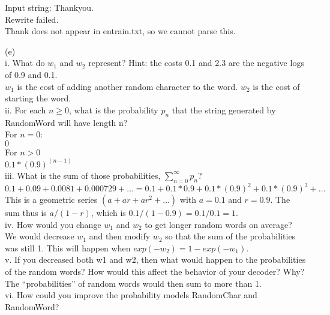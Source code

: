 \documentclass[11pt]{article} %
\begin{document}
Input string: Thankyou.\\
Rewrite failed.\\

Thank does not appear in entrain.txt, so we cannot parse this.\\

\newpage

(e) \\
i. What do $w_1$ and $w_2$ represent? Hint: the costs 0.1 and 2.3 are the negative logs of 0.9 and 0.1.\\

$w_1$ is the cost of adding another random character to the word. $w_2$ is the cost of starting the word.\\

ii. For each $n \geq 0$, what is the probability $p_n$ that the string generated by RandomWord will have length n?\\
For $n = 0$:\\
$0$\\
For $n > 0$\\
$0.1*(0.9)^(n-1)$\\

iii. What is the sum of those probabilities, $\sum_{n=0}^{\infty} p_n$?\\

$0.1 + 0.09 + 0.0081 + 0.000729 + \ldots = 0.1 + 0.1*0.9 + 0.1*(0.9)^2 + 0.1*(0.9)^3 + \ldots$\\
This is a geometric series $(a + ar + ar^2 + \ldots)$ with $a = 0.1$ and $r = 0.9$. The sum thus is $a/(1-r)$, which is $0.1/(1 - 0.9) = 0.1/0.1 = 1$. \\

iv. How would you change $w_1$ and $w_2$ to get longer random words on average?\\

We would decrease $w_1$ and then modify $w_2$ so that the sum of the probabilities was still 1. This will happen when $exp(-w_2) = 1 - exp(-w_1)$.\\

v. If you decreased both w1 and w2, then what would happen to the probabilities of the random words? How would this affect the behavior of your decoder? Why?\\

The ``probabilities” of random words would then sum to more than 1.\\

vi. How could you improve the probability models RandomChar and RandomWord?\\
\end{document}
